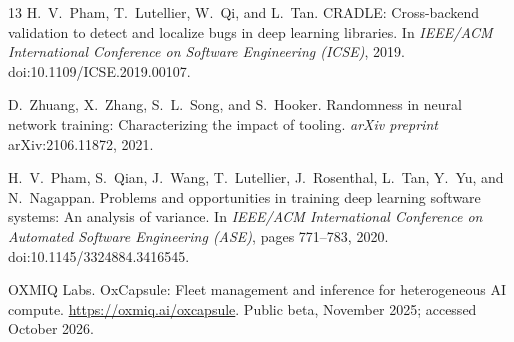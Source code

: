 \documentclass[11pt]{article}
\begin{document}
\begin{thebibliography}{13}
H.~V.~Pham, T.~Lutellier, W.~Qi, and L.~Tan.
\newblock CRADLE: Cross-backend validation to detect and localize bugs in
deep learning libraries.
\newblock In \emph{IEEE/ACM International Conference on Software Engineering
(ICSE)}, 2019.
\newblock doi:10.1109/ICSE.2019.00107.

D.~Zhuang, X.~Zhang, S.~L.~Song, and S.~Hooker.
\newblock Randomness in neural network training: Characterizing the impact of
tooling.
\newblock \emph{arXiv preprint} arXiv:2106.11872, 2021.

H.~V.~Pham, S.~Qian, J.~Wang, T.~Lutellier, J.~Rosenthal, L.~Tan, Y.~Yu,
and N.~Nagappan.
\newblock Problems and opportunities in training deep learning software
systems: An analysis of variance.
\newblock In \emph{IEEE/ACM International Conference on Automated Software
Engineering (ASE)}, pages 771--783, 2020.
\newblock doi:10.1145/3324884.3416545.

OXMIQ Labs.
\newblock OxCapsule: Fleet management and inference for heterogeneous
AI compute.
\newblock \url{https://oxmiq.ai/oxcapsule}. Public beta, November 2025;
accessed October 2026.

\end{thebibliography}
\end{document}
